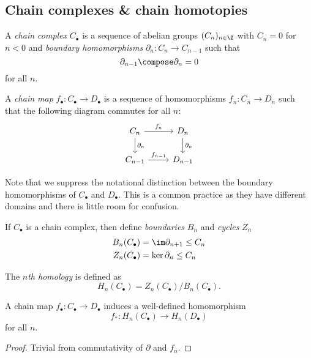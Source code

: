 \documentclass[a4paper]{article}
\renewcommand{\b}{\partial} %
\begin{document}
\subsection{Chain complexes \& chain homotopies}

\begin{definition}
  A \emph{chain complex} \(C_\bullet\) is a sequence of abelian groups \((C_n)_{n \in \Z}\) with \(C_n = 0\) for \(n < 0\) and \emph{boundary homomorphisms} \(\b_n: C_n \to C_{n - 1}\) such that
  \[
    \b_{n - 1} \compose \b_n = 0
  \]
  for all \(n\).

  A \emph{chain map} \(f_\bullet: C_\bullet \to D_\bullet\) is a sequence of homomorphisms \(f_n: C_n \to D_n\) such that the following diagram commutes for all \(n\):
  \[
    \begin{tikzcd}
      C_n \ar[r, "f_n"] \ar[d, "\b_n"] & D_n \ar[d, "\b_n"] \\
      C_{n - 1} \ar[r, "f_{n - 1}"] & D_{n - 1}
    \end{tikzcd}
  \]
\end{definition}

\begin{note}
  Note that we suppress the notational distinction between the boundary homomorphisms of \(C_\bullet\) and \(D_\bullet\). This is a common practice as they have different domains and there is little room for confusion.
\end{note}

\begin{definition}
  If \(C_\bullet\) is a chain complex, then define \emph{boundaries} \(B_n\) and \emph{cycles} \(Z_n\)
  \begin{align*}
    B_n(C_\bullet) &= \im \b_{n + 1} \leq C_n \\
    Z_n(C_\bullet) &= \ker \b_n \leq C_n
  \end{align*}

  The \emph{\(n\)th homology} is defined as
  \[
    H_n(C_\bullet) = Z_n(C_\bullet) / B_n(C_\bullet).
  \]
\end{definition}

\begin{lemma}
  A chain map \(f_\bullet: C_\bullet \to D_\bullet\) induces a well-defined homomorphism
  \[
    f_*: H_n(C_\bullet) \to H_n(D_\bullet)
  \]
  for all \(n\).
\end{lemma}

\begin{proof}
  Trivial from commutativity of \(\b\) and \(f_n\).
\end{proof}
\end{document}
